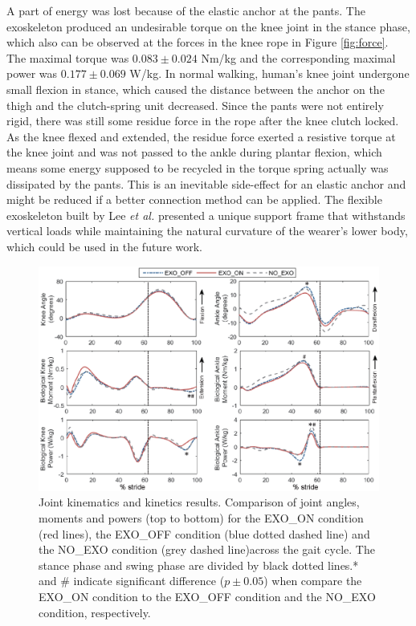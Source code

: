 \documentclass[twocolumn,cleanfoot,10pt]{asme2ej}
\begin{document}
A part of energy was lost because of the elastic anchor at the pants.
The exoskeleton produced an undesirable torque on the knee joint in the stance phase, which also can be observed at the forces in the knee rope in Figure \ref{fig:force}.
The maximal torque was $0.083\pm0.024$ Nm/kg and the corresponding maximal power was $0.177\pm0.069$ W/kg.
In normal walking, human’s knee joint undergone small flexion in stance, which caused the distance between the anchor on the thigh and the clutch-spring unit decreased.
Since the pants were not entirely rigid, there was still some residue force in the rope after the knee clutch locked.
As the knee flexed and extended, the residue force exerted a resistive torque at the knee joint and was not passed to the ankle during plantar flexion, which means some energy supposed to be recycled in the torque spring actually was dissipated by the pants.
This is an inevitable side-effect for an elastic anchor and might be reduced if a better connection method can be applied.
The flexible exoskeleton built by Lee \emph{et al.} \cite{exosuit} presented a unique support frame that withstands vertical loads while maintaining the natural curvature of the wearer's lower body, which could be used in the future work.

\begin{figure}[th]
	\centering
	\includegraphics[width=17cm]{compare.eps}
	\caption{Joint kinematics and kinetics results.
	Comparison of joint angles, moments and powers (top to bottom) for the EXO\_ON condition (red lines), the EXO\_OFF condition (blue dotted dashed line) and the NO\_EXO condition (grey dashed line)across the gait cycle.
	The stance phase and swing phase are divided by black dotted lines.* and \# indicate significant difference ($p\pm0.05$) when compare the EXO\_ON condition to the EXO\_OFF condition and the NO\_EXO condition, respectively.}
	\label{fig:kinetics}
\end{figure}
\end{document}
